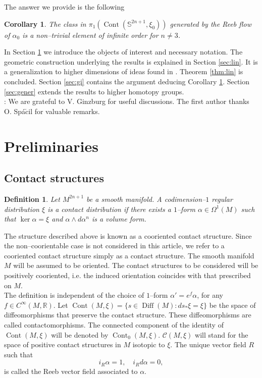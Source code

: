 \documentclass[10pt]{amsart}
\newtheorem{definition}[proposition]{Definition}
\newtheorem{corollary}[proposition]{Corollary}
\begin{document}
\noindent The answer we provide is the following
\begin{corollary}\label{cor:Gi}
The class in $\pi_1({\operatorname{Cont}}({\mathbb{S}}^{2n+1},\xi_0))$ generated by the Reeb flow of $\alpha_0$ is a non--trivial element of infinite order for $n\neq3$.
\end{corollary}

\noindent In Section \ref{sec:pre} we introduce the objects of interest and necessary notation. The geometric construction underlying the results is explained in Section \ref{sec:lin}. It is a generalization to higher dimensions of ideas found in \cite{Ge}. Theorem \ref{thm:lin} is concluded. Section \ref{sec:gi} contains the argument deducing Corollary \ref{cor:Gi}. Section \ref{sec:gener} extends the results to higher homotopy groups.\\

: We are grateful to V. Ginzburg for useful discussions. The first author thanks O. Sp\'a$\check{\mbox{c}}$il for valuable remarks.

\section{Preliminaries}\label{sec:pre}
\subsection{Contact structures}
\begin{definition}
Let $M^{2n+1}$ be a smooth manifold. A codimension--$1$ regular distribution $\xi$ is a contact distribution if there exists a $1$--form $\alpha \in \Omega^1(M)$ such that $\ker \alpha = \xi$ and $\alpha \wedge d\alpha^{n}$ is a volume form.
\end{definition}
\noindent The structure described above is known as a cooriented contact structure. Since the non--coorientable case is not considered in this article, we refer to a cooriented contact structure simply as a contact structure. The smooth manifold $M$ will be assumed to be oriented. The contact structures to be considered will be positively cooriented, i.e. the induced orientation coincides with that prescribed on $M$.\\

\noindent The definition is independent of the choice of $1$--form $\alpha'= e^f \alpha$, for any $f\in C^{\infty}(M, {\mathbb{R}})$. Let ${\operatorname{Cont}}(M,\xi)=\{s\in{\operatorname{Diff}}(M):ds_*\xi=\xi\}$ be the space of diffeomorphisms that preserve the contact structure. These diffeomorphisms are called contactomorphisms. The connected component of the identity of ${\operatorname{Cont}}(M,\xi)$ will be denoted by ${\operatorname{Cont}}_0(M,\xi)$. ${\mathcal{C}}(M,\xi)$ will stand for the space of positive contact structures in $M$ isotopic to $\xi$. The unique vector field $R$ such that
$$i_R \alpha=1,\quad i_R d\alpha=0,$$
is called the Reeb vector field associated to $\alpha$.\\
\end{document}
